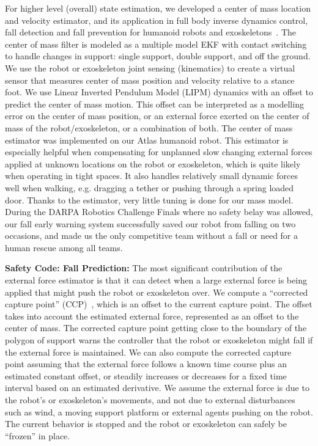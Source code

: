\documentclass[letterpaper,12pt,fullpage]{article}
\begin{document}
For higher level (overall) state estimation,
we developed a center of mass location and velocity estimator, and its
application in full body inverse dynamics control, fall detection
and fall prevention for humanoid robots and exoskeletons~\cite{}.
The center of mass filter is modeled as a multiple model EKF with contact switching
to handle changes in support: single support, double support, and off the ground.
We use the robot or exoskeleton
joint sensing (kinematics) to create a virtual sensor that measures
center of mass position and velocity relative to a stance foot.
We use Linear
Inverted Pendulum Model (LIPM) dynamics with an offset to predict
the center of mass motion. This offset can be interpreted
as a modelling error on the center of mass position, or an
external force exerted on the center of mass of the robot/exoskeleton,
or a combination of both. The center of mass estimator was
implemented on our Atlas humanoid robot. 
This estimator is especially helpful when compensating
for unplanned slow changing external forces applied at
unknown locations on the robot or exoskeleton, which is quite likely when
operating in tight spaces. It also handles relatively small
dynamic forces well when walking, e.g. dragging a tether
or pushing through a spring loaded door. Thanks to
the estimator, very little tuning is done for our mass model.
During the DARPA
Robotics Challenge Finals
where no safety belay was
allowed, our fall early warning system
successfully saved our robot from
falling on two occasions, and made us the only competitive team
without a fall or need for a human rescue among all teams.

{\bf Safety Code: Fall Prediction:}
The most significant contribution of the external force estimator is that it
can detect when a large external force is being applied that might
push the robot or exoskeleton over.
We compute a ``corrected capture point'' (CCP)~\cite{capture},
which is an offset to the current capture point.
The offset 
takes into account the estimated external force, represented as an offset
to the center of mass.
The corrected capture point getting close to the boundary of the polygon of
support warns the controller that the robot or exoskeleton might fall if the external
force is maintained.
We can also compute the corrected capture point assuming that the
external force follows a known time course plus an estimated constant offset,
or steadily increases or decreases for a fixed time interval
based on an estimated derivative.
We assume the external force is due to the robot's or exoskeleton's
movements, and not
due to external disturbances such as wind, a moving support platform
or external agents pushing on the robot.
The current
behavior is stopped and the robot or exoskeleton can safely be ``frozen'' in place.
\end{document}
